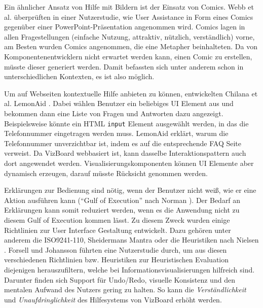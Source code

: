 \documentclass[
	headsepline,
	footsepline,
	fontsize=12pt,
	bibliography=totoc
]{scrbook}
\begin{document}

Ein ähnlicher Ansatz von Hilfe mit Bildern ist der Einsatz von Comics. Webb et al. \cite{Webb2012} überprüften in einer Nutzerstudie, wie User Assistance in Form eines Comics gegenüber einer PowerPoint-Präsentation angenommen wird. Comics lagen in allen Fragestellungen (einfache Nutzung, attraktiv, nützlich, verständlich) vorne, am Besten wurden Comics angenommen, die eine Metapher beinhalteten. Da von Komponentenentwicklern nicht erwartet werden kann, einen Comic zu erstellen, müsste dieser generiert werden. Damit befassten sich unter anderem schon \cite{Kurlander1996, Shamir2006, Chan2009, Wen2012} in unterschiedlichen Kontexten, es ist also möglich.


Um auf Webseiten kontextuelle Hilfe anbieten zu können, entwickelten Chilana et al. LemonAid \cite{Chilana2012}. Dabei wählen Benutzer ein beliebiges UI Element aus und bekommen dann eine Liste von Fragen und Antworten dazu angezeigt. Beispielsweise könnte ein HTML \texttt{input} Element ausgewählt werden, in das die Telefonnummer eingetragen werden muss. LemonAid erklärt, warum die Telefonnummer unverzichtbar ist, indem es auf die entsprechende FAQ Seite verweist. Da VizBoard webbasiert ist, kann dasselbe Interaktionspattern auch dort angewendet werden. Visualisierungskomponenten können UI Elemente aber dynamisch erzeugen, darauf müsste Rücksicht genommen werden.  



Erklärungen zur Bedienung sind nötig, wenn der Benutzer nicht weiß, wie er eine Aktion ausführen kann (\enquote{Gulf of Execution} nach Norman \cite{Norman1986}). Der Bedarf an Erklärungen kann somit reduziert werden, wenn es die Anwendung nicht zu diesem Gulf of Execution kommen lässt. Zu diesem Zweck wurden einige Richtlinien zur User Interface Gestaltung entwickelt. Dazu gehören unter anderem die ISO9241-110, Sheidermans Mantra \cite{Shneiderman1996} oder die Heuristiken nach Nielsen \cite{Nielsen1994}. Forsell und Johansson \cite{Forsell2010} führten eine Nutzerstudie durch, um aus diesen verschiedenen Richtlinien bzw. Heuristiken zur Heuristischen Evaluation \cite{Nielsen1994} diejenigen herauszufiltern, welche bei Informationsvisualisierungen hilfreich sind. Darunter finden sich Support für Undo/Redo, visuelle Konsistenz und den mentalen Aufwand des Nutzers gering zu halten. So kann die \emph{Verständlichkeit} und \emph{Unaufdringlichkeit} des Hilfesystems von VizBoard erhöht werden.
\end{document}
